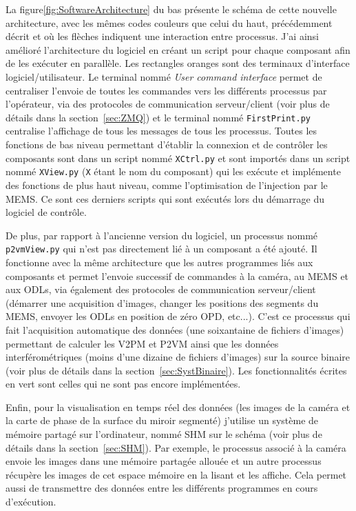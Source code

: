 La figure\ref{fig:SoftwareArchitecture} du bas présente le schéma de cette nouvelle architecture, avec les mêmes codes couleurs que celui du haut, précédemment décrit et où les flèches indiquent une interaction entre processus. J'ai ainsi amélioré l'architecture du logiciel en créant un script pour chaque composant afin de les exécuter en parallèle. Les rectangles oranges sont des terminaux d'interface logiciel/utilisateur. Le terminal nommé \textit{User command interface} permet de centraliser l'envoie de toutes les commandes vers les différents processus par l'opérateur, via des protocoles de communication serveur/client (voir plus de détails dans la section~\ref{sec:ZMQ}) et le terminal nommé \texttt{FirstPrint.py} centralise l'affichage de tous les messages de tous les processus. Toutes les fonctions de bas niveau permettant d'établir la connexion et de contrôler les composants sont dans un script nommé \texttt{XCtrl.py} et sont importés dans un script nommé \texttt{XView.py} (\texttt{X} étant le nom du composant) qui les exécute et implémente des fonctions de plus haut niveau, comme l'optimisation de l'injection par le \ac{MEMS}. Ce sont ces derniers scripts qui sont exécutés lors du démarrage du logiciel de contrôle.

De plus, par rapport à l'ancienne version du logiciel, un processus nommé \texttt{p2vmView.py} qui n'est pas directement lié à un composant a été ajouté. Il fonctionne avec la même architecture que les autres programmes liés aux composants et permet l'envoie successif de commandes à la caméra, au \ac{MEMS} et aux \ac{ODL}s, via également des protocoles de communication serveur/client (démarrer une acquisition d'images, changer les positions des segments du \ac{MEMS}, envoyer les \ac{ODL}s en position de zéro \ac{OPD}, etc...). C'est ce processus qui fait l'acquisition automatique des données (une soixantaine de fichiers d'images) permettant de calculer les \ac{V2PM} et \ac{P2VM} ainsi que les données interférométriques (moins d'une dizaine de fichiers d'images) sur la source binaire (voir plus de détails dans la section~\ref{sec:SystBinaire}). Les fonctionnalités écrites en vert sont celles qui ne sont pas encore implémentées.

Enfin, pour la visualisation en temps réel des données (les images de la caméra et la carte de phase de la surface du miroir segmenté) j'utilise un système de mémoire partagé sur l'ordinateur, nommé \ac{SHM} sur le schéma (voir plus de détails dans la section~\ref{sec:SHM}). Par exemple, le processus associé à la caméra envoie les images dans une mémoire partagée allouée et un autre processus récupère les images de cet espace mémoire en la lisant et les affiche. Cela permet aussi de transmettre des données entre les différents programmes en cours d'exécution.

